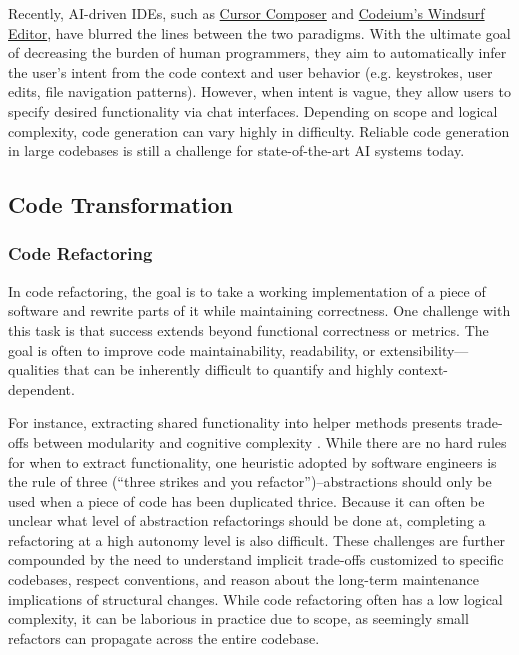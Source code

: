 Recently, AI-driven IDEs, such as \href{https://docs.cursor.com/composer}{Cursor Composer} and \href{https://codeium.com/windsurf}{Codeium's Windsurf Editor}, have blurred the lines between the two paradigms. With the ultimate goal of decreasing the burden of human programmers, they aim to automatically infer the user's intent from the code context and user behavior (e.g. keystrokes, user edits, file navigation patterns). However, when intent is vague, they allow users to specify desired functionality via chat interfaces. Depending on scope and logical complexity, code generation can vary highly in difficulty. Reliable code generation in large codebases is still a challenge for state-of-the-art AI systems today.



\subsection{Code Transformation}

\subsubsection{Code Refactoring} \label{sec:t-code-refactoring}

In code refactoring, the goal is to take a working implementation of a piece of software and rewrite parts of it while maintaining correctness. One challenge with this task is that success extends beyond functional correctness or metrics. The goal is often to improve code maintainability, readability, or extensibility—qualities that can be inherently difficult to quantify and highly context-dependent. 

For instance, extracting shared functionality into helper methods presents trade-offs between modularity and cognitive complexity \citep{parnas1972criteria}. While there are no hard rules for when to extract functionality, one heuristic adopted by software engineers is the rule of three (``three strikes and you refactor'')--abstractions should only be used when a piece of code has been duplicated thrice. Because it can often be unclear what level of abstraction refactorings should be done at, completing a refactoring at a high autonomy level is also difficult. These challenges are further compounded by the need to understand implicit trade-offs customized to specific codebases, respect conventions, and reason about the long-term maintenance implications of structural changes. While code refactoring often has a low logical complexity, it can be laborious in practice due to scope, as seemingly small refactors can propagate across the entire codebase. 

